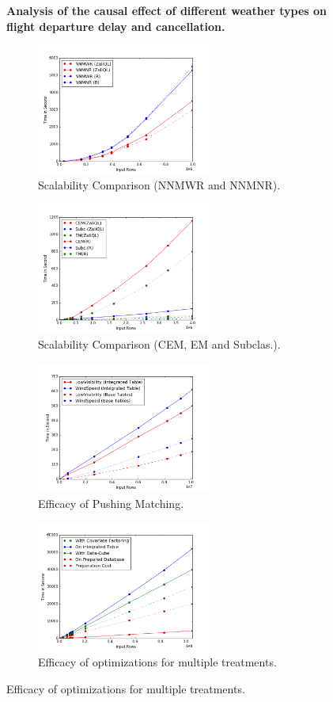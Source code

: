 \begin{figure}
\caption{ \bf{Analysis of the causal effect of different weather types on flight departure delay and cancellation.}}
\label{fig:eteresult}
\end{figure}


\begin{figure}
\begin{subfigure}{0.52\linewidth}
\centering
\includegraphics[height=4.3cm,width=\linewidth]{Figures/NNM.png}
\caption{Scalability Comparison (NNMWR and NNMNR).}
\label{sfig:testaa}
\end{subfigure}\hfill
\begin{subfigure}{0.49\linewidth}
\centering
\includegraphics[height=4.3cm,width=\linewidth]{Figures/exact.png}
\caption{Scalability Comparison (CEM, EM and Subclas.).}
\label{sfig:testbb}
\end{subfigure}\hfill

\begin{subfigure}{0.49\linewidth}
\centering
\includegraphics[height=4.3cm,width=1.07\linewidth]{Figures/opt1.png}
\caption{Efficacy of Pushing Matching.}
\label{sfig:testbc}
\end{subfigure}\hfill
\begin{subfigure}{0.49\linewidth}
\centering
\includegraphics[height=4.3cm,width=1.01\linewidth]{Figures/push.png}
\caption{Efficacy of optimizations for multiple treatments.}
\label{sfig:testbd}
\end{subfigure}\hfill


\end{figure}
